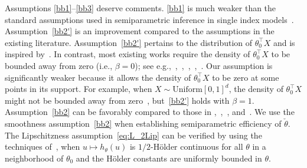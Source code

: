 {Assumptions \ref{bb1}--\ref{bb3} deserve comments. \ref{bb1} is much weaker than the  standard assumptions used in semiparametric inference in  single index models~\cite[Theorem 3.2]{VANC}. Assumption~\ref{bb2'} is an improvement compared to the assumptions in the existing literature. Assumption~\ref{bb2'} pertains to the distribution of $\theta_0^\top X$ and is inspired by~\cite[assumption~(D)]{MR2369025}. In contrast, most existing works require the density of $\theta_0^\top X$ to be bounded away from zero (i.e., $\beta=0$); see e.g.,~\cite[Assumption 5.3(II)]{ICHI93},~\cite[Assumption (d)]{cuietal11},~\cite[Lemma F.3]{2017arXiv171205593B},~\cite[Assumption~A2]{MR2529970},~\cite[Assumption (A2)]{wang2015spline}. Our assumption is significantly weaker because it allows the density of $\theta_0^\top X$ to be zero at some points in its support. For example, when $X\sim\text{Uniform}[0,1]^d$, the density of $\theta_0^\top X$ might not be bounded away from zero~\citep[Figure 1]{MR2369025}, but~\ref{bb2'} holds with $\beta=1.$
  Assumption~\ref{bb2} can be favorably compared to those in \cite[Theorem 3.2]{VANC},~\cite[Assumption (A5)]{groeneboom2016current},~\cite[Assumption (A5)]{2017arXiv171205593B}, and~\cite[Assumption G2 (ii)]{song2014semiparametric}.  We use the smoothness assumption~\ref{bb2} when establishing semiparametric efficiency of $\check\theta$. The Lipschitzness assumption~\eqref{eq:L_2Lip} can be verified by using the techniques of~\cite{alonso1998lp}, when $u\mapsto h_{\theta} (u)$ is $1/2$-H\"{o}lder continuous for all $\theta$ in a neighborhood of $\theta_0$ and the H\"{o}lder constants  are uniformly bounded in $\theta$.

}

